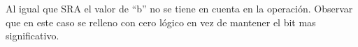 \documentclass[letterpaper]{sae}
\begin{document}
\begin{figure}[H] %
\label{fig:test9}
\end{figure}

Al igual que SRA el valor de “b” no se tiene en cuenta en la operación. 
Observar que en este caso se relleno con cero lógico en vez de mantener el bit mas significativo.
\end{document}
